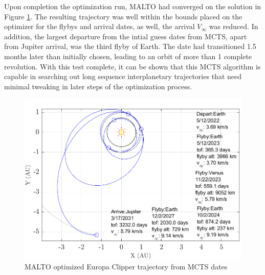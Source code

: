 \documentclass[letterpaper, preprint, paper,11pt]{AAS}	%
\begin{document}
Upon completion the optimization run, MALTO had converged on the solution in Figure \ref*{fig:clipMalto}. The resulting trajectory was well within the bounds placed on the optimizer for the flybys and arrival dates, as well, the arrival $V_\infty$ was reduced. In addition, the largest departure from the intial guess dates from MCTS, apart from Jupiter arrival, was the third flyby of Earth. The date had transitioned 1.5 months later than initially chosen, leading to an orbit of more than 1 complete revolution. With this test complete, it can be shown that this MCTS algorithm is capable in searching out long sequence interplanetary trajectories that need minimal tweaking in later steps of the optimization process. %

\begin{figure}[tb]
    \centering
    \includegraphics[width = 5in]{./fig/clipperMalto.png}
    \caption{MALTO optimized Europa Clipper trajectory from MCTS dates}
    \label{fig:clipMalto}
\end{figure}
\end{document}
